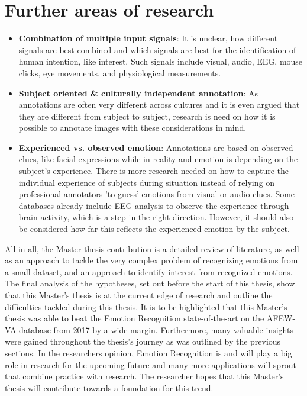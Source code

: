\section{Further areas of research}
\begin{itemize}
    \item \textbf{Combination of multiple input signals}: It is unclear, how different signals are best combined and which signals are best for the identification of human intention, like interest. Such signals include visual, audio, EEG, mouse clicks, eye movements, and physiological measurements.
    \item \textbf{Subject oriented \& culturally independent annotation}: As annotations are often very different across cultures and it is even argued that they are different from subject to subject, research is need on how it is possible to annotate images with these considerations in mind. 
    \item \textbf{Experienced vs. observed emotion}: Annotations are based on observed clues, like facial expressions while in reality and emotion is depending on the subject's experience. There is more research needed on how to capture the individual experience of subjects during situation instead of relying on professional annotators 'to guess' emotions from visual or audio clues. Some databases already include EEG analysis to observe the experience through brain activity, which is a step in the right direction. However, it should also be considered how far this reflects the experienced emotion by the subject.
\end{itemize}

All in all, the Master thesis contribution is a detailed review of literature, as well as an approach to tackle the very complex problem of recognizing emotions from a small dataset, and an approach to identify interest from recognized emotions. The final analysis of the hypotheses, set out before the start of this thesis, show that this Master's thesis is at the current edge of research and outline the difficulties tackled during this thesis. It is to be highlighted that this Master's thesis was able to beat the Emotion Recognition state-of-the-art on the AFEW-VA database from 2017 by a wide margin. Furthermore, many valuable insights were gained throughout the thesis's journey as was outlined by the previous sections. 
\newline\newline
In the researchers opinion, Emotion Recognition is and will play a big role in research for the upcoming future and many more applications will sprout that combine practice with research. The researcher hopes that this Master's thesis will contribute towards a foundation for this trend.

